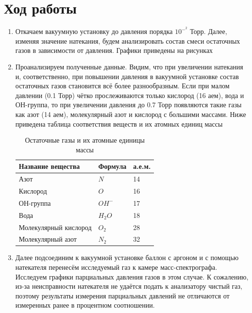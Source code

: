 \documentclass[a4paper]{article}
\begin{document}
\section{Ход работы}

\begin{enumerate}
    \item Откачаем вакуумную установку до давления порядка $10^-^2$ Торр. Далее, изменяя значение натекания, будем анализировать состав смеси остаточных газов в зависимости от давления. Графики приведены на рисунках 
    
    
    


\newpage

\item Проанализируем полученные данные. Видим, что при увеличении натекания и, соответственно, при повышении давления в вакуумной установке состав остаточных газов становится всё более разнообразным. Если при малом давлении (0.1 Торр) чётко прослеживаются только кислород (16 аем), вода и ОН-группа, то при увеличении давления до 0.7 Торр появляются такие газы как азот (14 аем), молекулярный азот и кислород с большими массами. Ниже приведена таблица соответствия веществ и их атомных единиц массы

        \begin{table}[h]
    \centering
    \begin{center}
    \caption{Остаточные газы и их атомные единицы массы}
    \end{center}
    \vspace{0.1cm}
    \label{tab:my_label}
    \begin{tabular}{ |p{4cm}||p{2cm}|p{2cm}|}
 \hline
 Название вещества & Формула & а.е.м. \\
 \hline
 \hline
Азот  & $N$ & 14 \\
   \hline
Кислород  & $O$ & 16 \\
   \hline
  ОН-группа & $OH^-$ & 17 \\
   \hline
Вода  & $H_2 O$ & 18 \\

   \hline
Молекулярный кислород  & $O_2$ & 28\\
   \hline
Молекулярный азот  & $N_2$ & 32\\
\hline
 
\end{tabular}
\end{table}

\item Далее подсоединим к вакуумной установке баллон с аргоном и с помощью натекателя перенесём исследуемый газ к камере масс-спектрографа. Исследуем графики парциальных давления газов в этом случае. К сожалению, из-за неисправности натекателя не удаётся подать к анализатору чистый газ, поэтому результаты измерения парциальных давлений не отличаются от измеренных ранее в процентном соотношении.


\end{enumerate}
\end{document}
